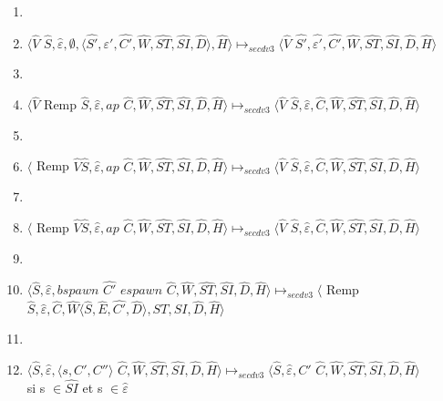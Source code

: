 \documentclass[10pt,a4paper]{article}
\begin{document}
\begin{enumerate}
					\item[]
					\item $\langle\widehat{V}$ $\widehat{S},\widehat{\varepsilon},\emptyset,\langle\widehat{S'},\widehat{\varepsilon'},\widehat{C'},\widehat{W},\widehat{ST},\widehat{SI},\widehat{D}\rangle,\widehat{H}\rangle \longmapsto_{secdv3} \langle \widehat{V}$ $\widehat{S'},\widehat{\varepsilon'},\widehat{C'},\widehat{W},\widehat{ST},\widehat{SI},\widehat{D},\widehat{H}\rangle$
					\item[]
					\item $\langle\widehat{V}$ Remp $\widehat{S},\widehat{\varepsilon},ap$ $\widehat{C},\widehat{W},\widehat{ST},\widehat{SI},\widehat{D},\widehat{H}\rangle \longmapsto_{secdv3} \langle \widehat{V}$ $\widehat{S},\widehat{\varepsilon},\widehat{C},\widehat{W},\widehat{ST},\widehat{SI},\widehat{D},\widehat{H}\rangle$
					\item[]
					\item $\langle$ Remp $\widehat{V}\widehat{S},\widehat{\varepsilon},ap$ $\widehat{C},\widehat{W},\widehat{ST},\widehat{SI},\widehat{D},\widehat{H}\rangle \longmapsto_{secdv3} \langle \widehat{V}$ $\widehat{S},\widehat{\varepsilon},\widehat{C},\widehat{W},\widehat{ST},\widehat{SI},\widehat{D},\widehat{H}\rangle$
					\item[]
					\item $\langle$ Remp $\widehat{V}\widehat{S},\widehat{\varepsilon},ap$ $\widehat{C},\widehat{W},\widehat{ST},\widehat{SI},\widehat{D},\widehat{H}\rangle \longmapsto_{secdv3} \langle \widehat{V}$ $\widehat{S},\widehat{\varepsilon},\widehat{C},\widehat{W},\widehat{ST},\widehat{SI},\widehat{D},\widehat{H}\rangle$
					\item[]
					\item $\langle\widehat{S},\widehat{\varepsilon},bspawn$ $\widehat{C'}$ $espawn$ $\widehat{C},\widehat{W},\widehat{ST},\widehat{SI},\widehat{D},\widehat{H}\rangle \longmapsto_{secdv3} \langle$ Remp $\widehat{S},\widehat{\varepsilon},\widehat{C},\widehat{W}\langle\widehat{S},\widehat{E},\widehat{C'},\widehat{D}\rangle,\widehat{ST},\widehat{SI},\widehat{D},\widehat{H}\rangle$
					\item[]
			    	\item $\langle\widehat{S},\widehat{\varepsilon},\langle s, C',C''\rangle$ $\widehat{C},\widehat{W},\widehat{ST},\widehat{SI},\widehat{D},\widehat{H}\rangle \longmapsto_{secdv3} \langle\widehat{S},\widehat{\varepsilon},C'$ $\widehat{C},\widehat{W},\widehat{ST},\widehat{SI},\widehat{D},\widehat{H}\rangle$ 
			    	\\si s $\in \widehat{SI}$ et s $\in \widehat{\varepsilon}$ 

\end{enumerate}
\end{document}
